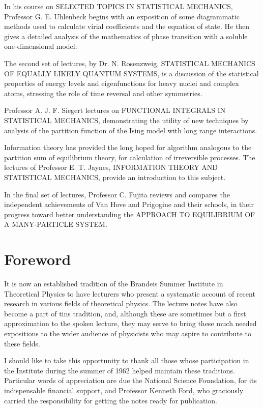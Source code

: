 \documentclass[]{article}
\begin{document}
In his course on SELECTED TOPICS IN STATISTICAL MECHANICS, Professor G.
E. Uhlenbeck begins with an exposition of some diagrammatic methods used
to calculate virial coefficients and the equation of state. He then
gives a detailed analysis of the mathematics of phase transition with a
soluble one-dimensional model.

The second set of lectures, by Dr. N. Rosenzweig, STATISTICAL MECHANICS
OF EQUALLY LIKELY QUANTUM SYSTEMS, is a discussion of the statistical
properties of energy levels and eigenfunctions for heavy nuclei and
complex atoms, stressing the role of time reversal and other symmetries.

Professor A. J. F. Siegert lectures on FUNCTIONAL INTEGRALS IN
STATISTICAL MECHANICS, demonstrating the utility of new techniques by
analysis of the partition function of the Ising model with long range
interactions.

Information theory has provided the long hoped for algorithm analogous
to the partition sum of equilibrium theory, for calculation of
irreversible processes. The lectures of Professor E. T. Jaynes,
INFORMATION THEORY AND STATISTICAL MECHANICS, provide an introduction to
this subject.

In the final set of lectures, Professor C. Fujita reviews and compares
the independent achievements of Van Hove and Prigogine and their
schools, in their progress toward better understanding the APPROACH TO
EQUILIBRIUM OF A MANY-PARTICLE SYSTEM.



\section*{Foreword}

It is now an established tradition of the Brandeis Summer Institute in
Theoretical Physics to have lecturers who present a systematic account
of recent research in various fields of theoretical physics. The lecture
notes have also become a part of tins tradition, and, although these are
sometimes but a first approximation to the spoken lecture, they may
serve to bring these much needed expositions to the wider audience of
physicists who may aspire to contribute to these fields.

I should like to take this opportunity to thank all those whose
participation in the Institute during the summer of 1962 helped maintain
these traditions. Particular words of appreciation are due the National
Science Foundation, for its indispensable financial support, and
Professor Kenneth Ford, who graciously carried the responsibility for
getting the notes ready for publication.
\end{document}

